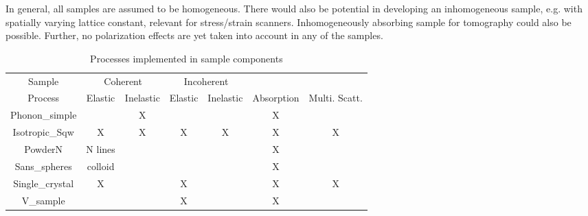 In general, all samples are assumed to be homogeneous. There would also be
potential in developing an inhomogeneous sample, e.g. with
spatially varying lattice constant, relevant for stress/strain scanners.
Inhomogeneously absorbing sample for tomography could also be possible.
Further, no polarization effects are yet taken into account in any
of the samples.

\begin{table}
  \begin{center}
  {\let\my=\\
    \begin{tabular}{|c|cc|cc|c|c|}
    \hline
    Sample        & \multicolumn{2}{c|}{Coherent} & \multicolumn{2}{c|}{Incoherent} &&\\
    Process       & Elastic & Inelastic & Elastic & Inelastic & Absorption & Multi. Scatt.\\
    \hline
    Phonon\_simple&         & X         &         &           & X & \\
    Isotropic\_Sqw&  X      & X         & X       & X         & X & X \\
    PowderN       &  N lines&           &         &           & X & \\
    Sans\_spheres &  colloid&           &         &           & X & \\
    Single\_crystal& X      &           & X       &           & X & X \\
    V\_sample     &         &           & X       &           & X & \\
    \hline
    \end{tabular}
    \caption{Processes implemented in sample components}
    \label{t:sample-process}
  }
  \end{center}
\end{table}

         \newpage
          \newpage
   \newpage
             \newpage
           \newpage
    

